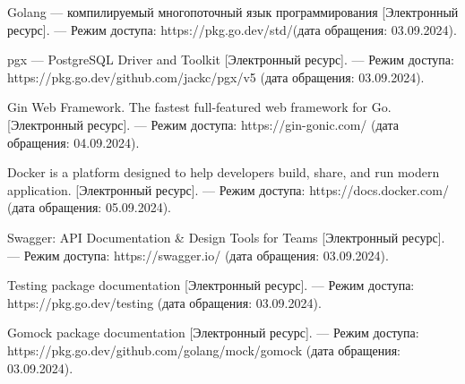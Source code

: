 \begin{thebibliography}{}
		
		Golang --- компилируемый многопоточный язык программирования  [Электронный ресурс]. --- Режим доступа: https://pkg.go.dev/std/(дата обращения: 03.09.2024).

		pgx --- PostgreSQL Driver and Toolkit [Электронный ресурс]. --- Режим доступа: https://pkg.go.dev/github.com/jackc/pgx/v5 (дата обращения: 03.09.2024).

		Gin Web Framework. The fastest full-featured web framework for Go. [Электронный ресурс]. --- Режим доступа: https://gin-gonic.com/ (дата обращения: 04.09.2024).

		Docker is a platform designed to help developers build, share, and run modern application. [Электронный ресурс]. --- Режим доступа: https://docs.docker.com/ (дата обращения: 05.09.2024).

		Swagger: API Documentation \& Design Tools for Teams [Электронный ресурс]. --- Режим доступа: https://swagger.io/ (дата обращения: 03.09.2024).

		Testing package documentation [Электронный ресурс]. --- Режим доступа:  https://pkg.go.dev/testing (дата обращения: 03.09.2024).

		Gomock package documentation [Электронный ресурс]. --- Режим доступа:  https://pkg.go.dev/github.com/golang/mock/gomock (дата обращения: 03.09.2024).


\end{thebibliography}
\endgroup

\pagebreak